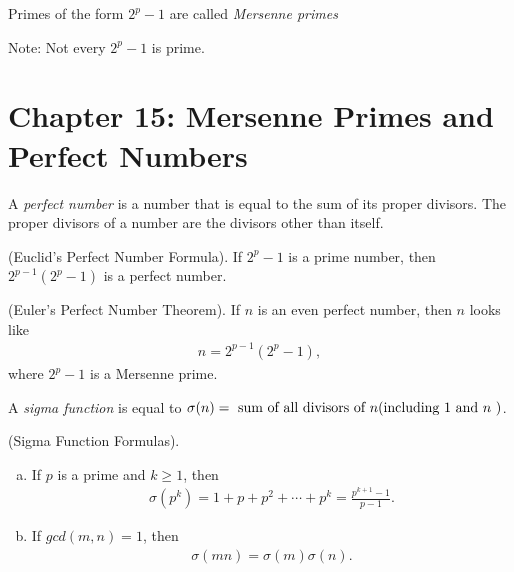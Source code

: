 \documentclass[graybox]{svmult}
\begin{document}
\begin{definition}
Primes of the form $2^p - 1$ are called \textit{Mersenne primes}
\end{definition}

Note: Not every $2^p-1$ is prime.

\section*{Chapter 15: Mersenne Primes and Perfect Numbers}

\begin{definition}
A \textit{perfect number} is a number that is equal to the sum of its proper divisors. The proper divisors of a number are the divisors other than itself.
\end{definition}

\begin{theorem}
(Euclid's Perfect Number Formula). If $2^p - 1$ is a prime number, then $2^{p-1}(2^p-1)$ is a perfect number.
\end{theorem}

\begin{theorem}
(Euler's Perfect Number Theorem). If $n$ is an even perfect number, then $n$ looks like
\begin{align*}
n = 2^{p-1}(2^p-1),
\end{align*}
where $2^p-1$ is a Mersenne prime.
\end{theorem}

\begin{definition}
A \textit{sigma function} is equal to $\sigma(n) = \text{ sum of all divisors of } n \\
\text{(including 1 and } n \text{ )}$. 
\end{definition}

\begin{theorem}
(Sigma Function Formulas).
\begin{enumerate}[(a)]
\item If $p$ is a prime and $k \geqslant 1$, then
\begin{align*}
\sigma(p^k) = 1 + p + p^2 + \cdots + p^k = \frac{p^{k+1}-1}{p-1}.
\end{align*}
\item If $gcd(m, n) = 1$, then
\begin{align*}
\sigma(mn) = \sigma(m)\sigma(n).
\end{align*}
\end{enumerate}
\end{theorem}
\end{document}
